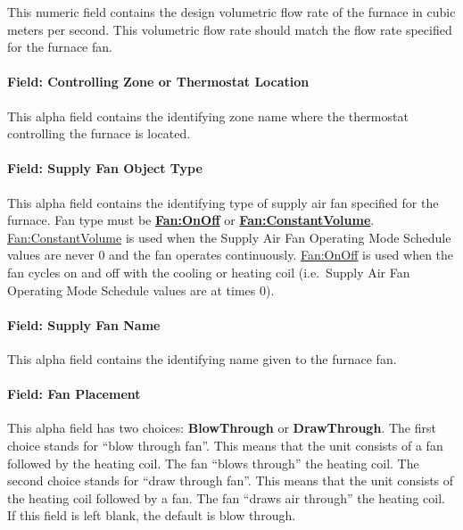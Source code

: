 This numeric field contains the design volumetric flow rate of the furnace in cubic meters per second. This volumetric flow rate should match the flow rate specified for the furnace fan.

\paragraph{Field: Controlling Zone or Thermostat Location}\label{field-controlling-zone-or-thermostat-location-5}

This alpha field contains the identifying zone name where the thermostat controlling the furnace is located.

\paragraph{Field: Supply Fan Object Type}\label{field-supply-fan-object-type-3}

This alpha field contains the identifying type of supply air fan specified for the furnace. Fan type must be \textbf{\hyperref[fanonoff]{Fan:OnOff}} or \textbf{\hyperref[fanconstantvolume]{Fan:ConstantVolume}}. \hyperref[fanconstantvolume]{Fan:ConstantVolume} is used when the Supply Air Fan Operating Mode Schedule values are never 0 and the fan operates continuously. \hyperref[fanonoff]{Fan:OnOff} is used when the fan cycles on and off with the cooling or heating coil (i.e.~Supply Air Fan Operating Mode Schedule values are at times 0).

\paragraph{Field: Supply Fan Name}\label{field-supply-fan-name-3}

This alpha field contains the identifying name given to the furnace fan.

\paragraph{Field: Fan Placement}\label{field-fan-placement-4}

This alpha field has two choices: \textbf{BlowThrough} or \textbf{DrawThrough}. The first choice stands for ``blow through fan''. This means that the unit consists of a fan followed by the heating coil. The fan ``blows through'' the heating coil. The second choice stands for ``draw through fan''. This means that the unit consists of the heating coil followed by a fan. The fan ``draws air through'' the heating coil. If this field is left blank, the default is blow through.

